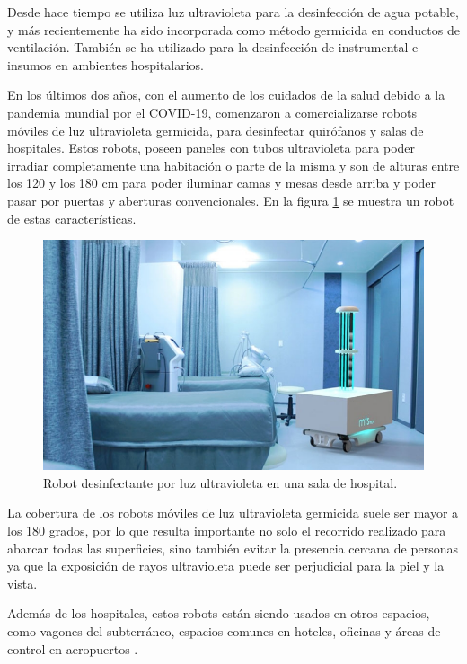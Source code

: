 Desde hace tiempo se utiliza luz ultravioleta para la desinfección de agua potable, y más recientemente ha sido incorporada como método germicida en conductos de ventilación. También se ha utilizado para la desinfección de instrumental e insumos en ambientes hospitalarios\citep{inventos}. 

En los últimos dos años, con el aumento de los cuidados de la salud debido a la pandemia mundial por el COVID-19, comenzaron a comercializarse robots móviles de luz ultravioleta germicida, para desinfectar quirófanos y salas de hospitales\citep{interempresas}.  
Estos robots, poseen paneles con tubos ultravioleta para poder irradiar completamente una habitación o parte de la misma y son de alturas entre los 120 y los 180 cm para poder iluminar camas y mesas desde arriba y poder pasar por puertas y aberturas convencionales. En la figura \ref{fig:robotuv} se muestra un robot de estas características.

\begin{figure}[h]
	\centering
	\includegraphics[width=12cm]{./Figures/robothospitalario.PNG}
	\caption{Robot desinfectante por luz ultravioleta en una sala de hospital\protect\footnotemark.}
	\label{fig:robotuv}
\end{figure}

La cobertura de los robots móviles de luz ultravioleta germicida suele ser mayor a los 180 grados, por lo que resulta importante no solo el recorrido realizado para abarcar todas las superficies, sino también evitar la presencia cercana de personas ya que la exposición de rayos ultravioleta puede ser perjudicial para la piel y la vista.  

Además de los hospitales, estos robots están siendo usados en otros espacios, como vagones del subterráneo, espacios comunes en hoteles, oficinas y áreas de control en aeropuertos \citep{masrobots}.


